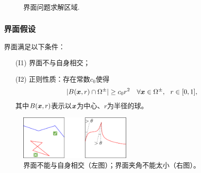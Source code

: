\documentclass[notheorems,serif]{beamer}
\begin{document}
\begin{frame}
\begin{minipage}[b]{0.38\linewidth}
\begin{figure}[htpb]
        \caption{界面问题求解区域.}
    \end{figure}
\vspace{10pt}
\end{minipage}
\end{frame}

\begin{frame}
    \frametitle{界面假设}
\begin{assumption}[界面假设]
界面满足以下条件：
\begin{itemize}
\item[(I1)]\label{asp:I1} 界面不与自身相交；
\item[(I2)]\label{asp:I2} 正则性质：存在常数$c_0$使得
\begin{equation}
\label{Dregular}
|B(\boldsymbol{x},r)\cap \Omega^{\pm}| \ge c_0 r^2 ~~~ \forall \boldsymbol{x} \in \Omega^{\pm}, ~~ r\in[0,1],
\end{equation}
其中$B(\boldsymbol{x},r)$表示以$\boldsymbol{x}$为中心、$r$为半径的球。
\end{itemize}
\end{assumption}
\begin{figure}[htpb]
    \centering
    \includegraphics[width=0.5\textwidth]{../figures/maxwell/interface_assumption.pdf}
    \caption{界面不能与自身相交（左图）；界面夹角不能太小（右图）。}
\end{figure}
\end{frame}
\end{document}
